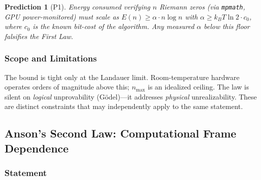 \documentclass[12pt]{article}
\theoremstyle{lawstyle}
\theoremstyle{conjstyle}
\theoremstyle{predstyle}
\newtheorem{prediction}{Prediction}
\begin{document}
\begin{prediction}[P1]
Energy consumed verifying $n$ Riemann zeros (via \texttt{mpmath}, GPU power-monitored) must
scale as $E(n) \geq \alpha \cdot n \log n$ with $\alpha \geq k_B T \ln 2 \cdot c_0$, where
$c_0$ is the known bit-cost of the algorithm. Any measured $\alpha$ below this floor falsifies
the First Law.
\end{prediction}

\subsubsection*{Scope and Limitations}

The bound is tight only at the Landauer limit. Room-temperature hardware operates orders of
magnitude above this; $n_{\max}$ is an idealized ceiling. The law is silent on \emph{logical}
unprovability (G\"odel)---it addresses \emph{physical} unrealizability. These are distinct
constraints that may independently apply to the same statement.

\bigskip

\subsection{Anson's Second Law: Computational Frame Dependence}

\subsubsection*{Statement}
\end{document}
